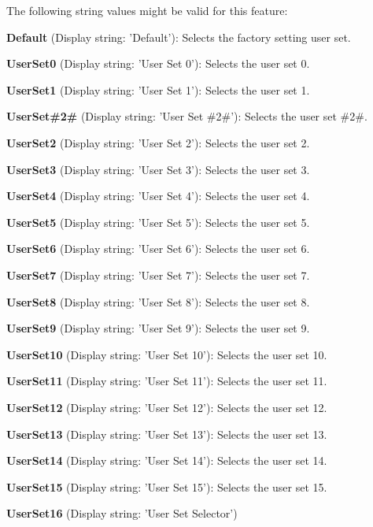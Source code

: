 The following string values might be valid for this feature\+:
\begin{DoxyItemize}
\item {\bfseries Default} (Display string\+: 'Default')\+: Selects the factory setting user set.
\item {\bfseries User\+Set0} (Display string\+: 'User Set 0')\+: Selects the user set 0.
\item {\bfseries User\+Set1} (Display string\+: 'User Set 1')\+: Selects the user set 1.
\item {\bfseries User\+Set\#2\#} (Display string\+: 'User Set \#2\#')\+: Selects the user set \#2\#.
\item {\bfseries User\+Set2} (Display string\+: 'User Set 2')\+: Selects the user set 2.
\item {\bfseries User\+Set3} (Display string\+: 'User Set 3')\+: Selects the user set 3.
\item {\bfseries User\+Set4} (Display string\+: 'User Set 4')\+: Selects the user set 4.
\item {\bfseries User\+Set5} (Display string\+: 'User Set 5')\+: Selects the user set 5.
\item {\bfseries User\+Set6} (Display string\+: 'User Set 6')\+: Selects the user set 6.
\item {\bfseries User\+Set7} (Display string\+: 'User Set 7')\+: Selects the user set 7.
\item {\bfseries User\+Set8} (Display string\+: 'User Set 8')\+: Selects the user set 8.
\item {\bfseries User\+Set9} (Display string\+: 'User Set 9')\+: Selects the user set 9.
\item {\bfseries User\+Set10} (Display string\+: 'User Set 10')\+: Selects the user set 10.
\item {\bfseries User\+Set11} (Display string\+: 'User Set 11')\+: Selects the user set 11.
\item {\bfseries User\+Set12} (Display string\+: 'User Set 12')\+: Selects the user set 12.
\item {\bfseries User\+Set13} (Display string\+: 'User Set 13')\+: Selects the user set 13.
\item {\bfseries User\+Set14} (Display string\+: 'User Set 14')\+: Selects the user set 14.
\item {\bfseries User\+Set15} (Display string\+: 'User Set 15')\+: Selects the user set 15.
\item {\bfseries User\+Set16} (Display string\+: 'User Set Selector')
\end{DoxyItemize}

